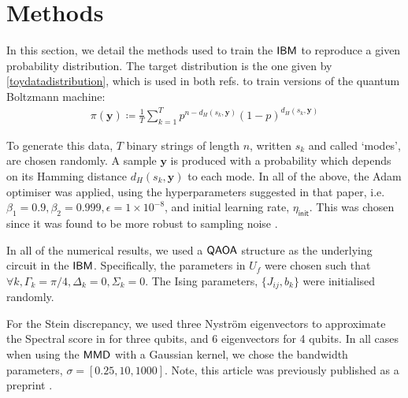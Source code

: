 \section*{Methods}\label{sec:methods}
In this section, we detail the methods used to train the $\textsf{IBM}$ to reproduce a given probability distribution. The target distribution is the one given by \eqref{toydatadistribution}, which is used in both refs.\cite{amin_quantum_2018, verdon_quantum_2017} to train versions of the quantum Boltzmann machine:
\begin{align}
    \pi(\mathbf{y}) \coloneqq \frac{1}{T}\sum\limits_{k=1}^T 
    p^{n - d_H(s_k, \mathbf{y})}
    (1-p)^{d_H(s_k, \mathbf{y})}
\label{toydatadistribution}
\end{align}

\noindent To generate this data, $T$ %
binary strings of length $n$, written $s_k$ and called `modes',  
are chosen randomly. 
A sample $\mathbf{y}$ is produced with a probability which depends on its Hamming distance $d_H(s_k, \mathbf{y})$ to each mode. In all of the above, the Adam \cite{kingma_adam:_2014} optimiser was applied, using the hyperparameters suggested in that paper, i.e.\@ $\beta_1 = 0.9, \beta_2 = 0.999, \epsilon = 1\times 10^{-8}$, and initial learning rate, $\eta_{\mathsf{init}}$. This was chosen since it was found to be more robust to sampling noise \cite{liu_differentiable_2018}.

In all of the numerical results, we used a $\operatorname{\textsf{QAOA}}$ structure as the underlying circuit in the $\textsf{IBM}$. Specifically, the parameters in $U_f$ were chosen such that $\forall k, \Gamma_k = \pi/4, \Delta_k = 0, \Sigma_k = 0$. The Ising parameters, $\{J_{ij}, b_k\}$ were initialised randomly. 

For the Stein discrepancy, we used three Nystr\"{o}m eigenvectors to approximate the Spectral score in  for three qubits, and 6 eigenvectors for 4 qubits. In all cases when using the $\operatorname{\textsf{MMD}}$ with a Gaussian kernel, we chose the bandwidth parameters, $\sigma = [0.25, 10, 1000]$\cite{liu_differentiable_2018}. Note, this article was previously published as a preprint \cite{coyle_born_2019}.

